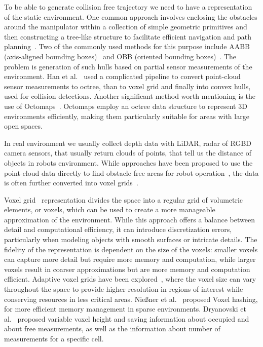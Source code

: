 \documentclass[letterpaper, 10 pt, conference]{ieeeconf}  %
\begin{document}
To be able to generate collision free trajectory we need to have a representation of the static environment. One common approach involves enclosing the obstacles around the manipulator within a collection of simple geometric primitives and then constructing a tree-like structure to facilitate efficient navigation and path planning~\cite{dai2022review}. Two of the commonly used methods for this purpose include AABB (axis-aligned bounding boxes)~\cite{vandenbergen1997efficient, chen2018path, luo2018collisionfree} and OBB (oriented bounding boxes)~\cite{gottschalk1996obbtree, puiu2011realtime}. The problem is generation of such hulls based on partial sensor measurements of the environment. Han et al.~\cite{han2018dynamic} used a complicated pipeline to convert point-cloud sensor measurements to octree, than to voxel grid and finally into convex hulls, used for collision detections. Another significant method worth mentioning is the use of Octomaps~\cite{wurmOctoMap}. Octomaps employ an octree data structure to represent 3D environments efficiently, making them particularly suitable for areas with large open spaces. 

In real environment we usually collect depth data with LiDAR, radar of RGBD camera sensors, that usually return clouds of points, that tell us the distance of objects in robots environment. While approaches have been proposed to use the point-cloud data directly to find obstacle free areas for robot operation~\cite{gao2019flying}, the data is often further converted into voxel grids~\cite{xu2021voxel, oleynikova2017voxblox, han2019fiesta}.

Voxel grid~\cite{xu2021voxel, elfes1989using} representation divides the space into a regular grid of volumetric elements, or voxels, which can be used to create a more manageable approximation of the environment. While this approach offers a balance between detail and computational efficiency, it can introduce discretization errors, particularly when modeling objects with smooth surfaces or intricate details. The fidelity of the representation is dependent on the size of the voxels: smaller voxels can capture more detail but require more memory and computation, while larger voxels result in coarser approximations but are more memory and computation efficient. Adaptive voxel grids have been explored~\cite{xu2021voxel}, where the voxel size can vary throughout the space to provide higher resolution in regions of interest while conserving resources in less critical areas. Nießner et al.~\cite{niessner2013realtime} proposed Voxel hashing, for more efficient memory management in sparse environments. Dryanovski et al.~\cite{dryanovski2010multivolume} proposed variable voxel height and saving information about occupied and about free measurements, as well as the information about number of measurements for a specific cell.
\end{document}
